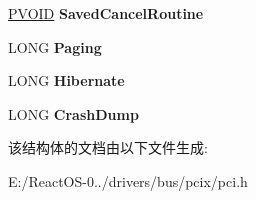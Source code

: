 \begin{DoxyCompactItemize}
\mbox{\label{struct___p_c_i___p_o_w_e_r___s_t_a_t_e_ae80c86c60270de7075e42b3f2f796633}} 
\hyperlink{interfacevoid}{P\+V\+O\+ID} {\bfseries Saved\+Cancel\+Routine}
\item 
\mbox{\label{struct___p_c_i___p_o_w_e_r___s_t_a_t_e_ae4aa7b10434a935bda4b8b5d0b83b5dc}} 
L\+O\+NG {\bfseries Paging}
\item 
\mbox{\label{struct___p_c_i___p_o_w_e_r___s_t_a_t_e_a750a7639253fb82d453f146289360d1d}} 
L\+O\+NG {\bfseries Hibernate}
\item 
\mbox{\label{struct___p_c_i___p_o_w_e_r___s_t_a_t_e_a0bd9c4ce9dc898090cc92f368ae7d1db}} 
L\+O\+NG {\bfseries Crash\+Dump}
\end{DoxyCompactItemize}


该结构体的文档由以下文件生成\+:\begin{DoxyCompactItemize}
\item 
E\+:/\+React\+O\+S-\/0../drivers/bus/pcix/pci.\+h\end{DoxyCompactItemize}
